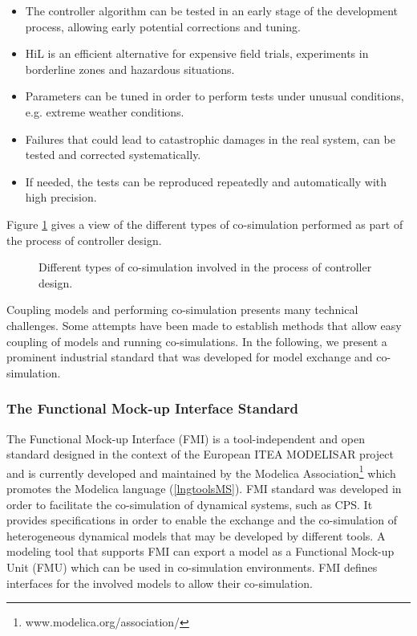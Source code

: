 \begin{itemize}

\item The controller algorithm can be tested in an early stage of the development process, allowing early potential corrections and tuning.

\item HiL is an efficient alternative for expensive field trials, experiments in borderline zones and hazardous situations.

\item Parameters can be tuned in order to perform tests under unusual conditions, e.g. extreme weather conditions. 

\item Failures that could lead to catastrophic damages in the real system, can be tested and corrected systematically.  

\item If needed, the tests can be reproduced repeatedly and automatically with high precision.

\end{itemize}

Figure \ref{fig:mbd} gives a view of the different types of co-simulation performed as part of the process of controller design.

\begin{figure}[phbt]
\centering

\caption{Different types of co-simulation involved in the process of controller design.}
\label{fig:mbd}
\end{figure}

Coupling models and performing co-simulation presents many technical challenges. Some attempts have been made to establish methods that allow easy coupling of models and running co-simulations. In the following, we present a prominent industrial standard that was developed for model exchange and co-simulation.  

\subsubsection{The Functional Mock-up Interface Standard}

The Functional Mock-up Interface (FMI) is a tool-independent and open standard designed in the context of the European ITEA MODELISAR project and is currently developed and maintained by the Modelica Association\footnote{www.modelica.org/association/} which promotes the Modelica language (\ref{lngtoolsMS}). FMI standard was developed in order to facilitate the co-simulation of dynamical systems, such as CPS. It provides specifications in order to enable the exchange and the co-simulation of heterogeneous dynamical models that may be developed by different tools. A modeling tool that supports FMI can export a model as a Functional Mock-up Unit (FMU) which can be used in co-simulation environments. FMI defines interfaces for the involved models to allow their co-simulation.

